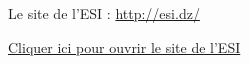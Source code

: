 \documentclass{article}
\begin{document}
	Le site de l'ESI : \url{http://esi.dz/}
	
	\href{http://esi.dz/}{Cliquer ici pour ouvrir le site de l'ESI}
\end{document}

